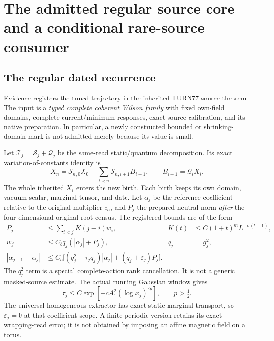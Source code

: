 \section{The admitted regular source core and a conditional rare-source consumer}
\label{sec:volterra}

\subsection{The regular dated recurrence}

Evidence  registers the tuned trajectory in the inherited TURN77 source theorem. The input is a \emph{typed complete coherent Wilson family} with fixed own-field domains, complete current/minimum responses, exact source calibration, and its native preparation. In particular, a newly constructed bounded or shrinking-domain mark is not admitted merely because its value is small.

Let $\mathcal T_j=\mathcal S_j+\mathcal Q_j$ be the same-read static/quantum decomposition. Its exact variation-of-constants identity is
\begin{equation}\label{eq:dated-identity}
 X_n=\mathcal S_{n,0}X_0+
       \sum_{i<n}\mathcal S_{n,i+1}B_{i+1},\qquad
 B_{i+1}=\mathcal Q_iX_i.
\end{equation}
The whole inherited $X_i$ enters the new birth. Each birth keeps its own domain, vacuum scalar, marginal tensor, and date. Let $\alpha_j$ be the reference coefficient relative to the original multiplier $c_a$, and $P_j$ the prepared neutral norm \emph{after} the four-dimensional original root census. The registered bounds are of the form
\begin{align}\label{eq:regular-volterra}
 P_j&\le\sum_{i<j}K(j-i)w_i,
 &K(t)&\le C(1+t)^mL^{-\sigma(t-1)},\nonumber\\
 w_j&\le C_bq_j(|\alpha_j|+P_j),
 &q_j&=g_j^2,\\
 |\alpha_{j+1}-\alpha_j|
 &\le C_a\bigl[(q_j^2+\tau_jq_j)|\alpha_j|
                       +(q_j+\varepsilon_j)P_j\bigr].\nonumber
\end{align}
The $q_j^2$ term is a special complete-action rank cancellation. It is not a generic masked-source estimate. The actual running Gaussian window gives
\[
 \tau_j\le C\exp[-cA_1^2(\log x_j)^{2p}],\qquad p>\tfrac12.
\]
The universal homogeneous extractor has exact static marginal transport, so $\varepsilon_j=0$ at that coefficient scope. A finite periodic version retains its exact wrapping-read error; it is not obtained by imposing an affine magnetic field on a torus.

